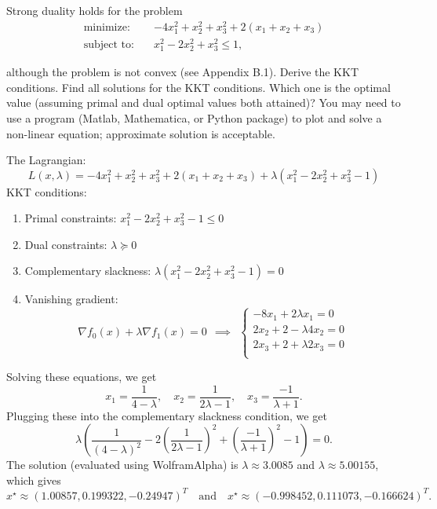 \documentclass[11pt]{article}
\begin{document}
\begin{homeworkProblem}

    Strong duality holds for the problem
    \begin{align*}
        \text{minimize:} \quad   & -4x_1^2 + x_2^2 + x_3^2 + 2(x_1 + x_2 + x_3) \\
        \text{subject to:} \quad & x_1^2 - 2x_2^2 + x_3^2 \leq 1,
    \end{align*}

    although the problem is not convex (see Appendix B.1). Derive the KKT conditions. Find all
    solutions for the KKT conditions. Which one is the optimal value (assuming primal and dual
    optimal values both attained)? You may need to use a program (Matlab, Mathematica, or
    Python package) to plot and solve a non-linear equation; approximate solution is acceptable. \\

    \solution

    The Lagrangian:
    \[
        L(x, \lambda) = -4x_1^2 + x_2^2 + x_3^2 + 2(x_1 + x_2 + x_3) + \lambda (x_1^2 - 2x_2^2 + x_3^2 - 1)
    \]
    KKT conditions:
    \begin{enumerate}[label=(\alph*), topsep=5pt, itemsep=5pt]
        \item Primal constraints: $x_1^2 - 2x_2^2 + x_3^2 - 1 \leq 0$
        \item Dual constraints: $\lambda \succeq 0$
        \item Complementary slackness: $\lambda (x_1^2 - 2x_2^2 + x_3^2 - 1) = 0$
        \item Vanishing gradient:
              \begin{equation*}
                  \nabla f_0(x) + \lambda \nabla f_1(x) = 0 ~ ~ \implies ~ ~
                  \begin{cases}
                      -8x_1 + 2 \lambda x_1 = 0   \\
                      2x_2 + 2 - \lambda 4x_2 = 0 \\
                      2x_3 + 2 + \lambda 2x_3 = 0 \\
                  \end{cases}
              \end{equation*}
    \end{enumerate}
    Solving these equations, we get
    \[
        x_1 = \frac{1}{4 - \lambda}, \quad x_2 = \frac{1}{2\lambda-1}, \quad x_3 = \frac{-1}{\lambda + 1}.
    \]
    Plugging these into the complementary slackness condition, we get
    \[
        \lambda \left( \frac{1}{(4 - \lambda)^2} - 2 \left( \frac{1}{2\lambda-1} \right)^2 + \left( \frac{-1}{\lambda + 1} \right)^2 - 1 \right) = 0.
    \]
    The solution (evaluated using WolframAlpha) is $\lambda \approx 3.0085$ and $\lambda \approx 5.00155$, which gives
    \[
        x^{\star} \approx (1.00857, 0.199322, -0.24947)^T \quad \text{and} \quad x^{\star} \approx (-0.998452, 0.111073, -0.166624)^T.
    \]
\end{homeworkProblem}
\end{document}

